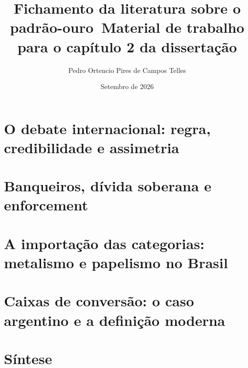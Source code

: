 \documentclass[12pt,oneside]{report}
\title{Fichamento da literatura sobre o padrão-ouro\
\large Material de trabalho para o capítulo 2 da dissertação}
\author{Pedro Ortencio Pires de Campos Telles}
\date{Setembro de 2026}
\begin{document}
\maketitle
{}
\tableofcontents
\clearpage
{}



\part{O debate internacional: regra, credibilidade e assimetria}












\part{Banqueiros, dívida soberana e enforcement}











\part{A importação das categorias: metalismo e papelismo no Brasil}









% 

\part{Caixas de conversão: o caso argentino e a definição moderna}



\part{Síntese}
% 



\end{document}
